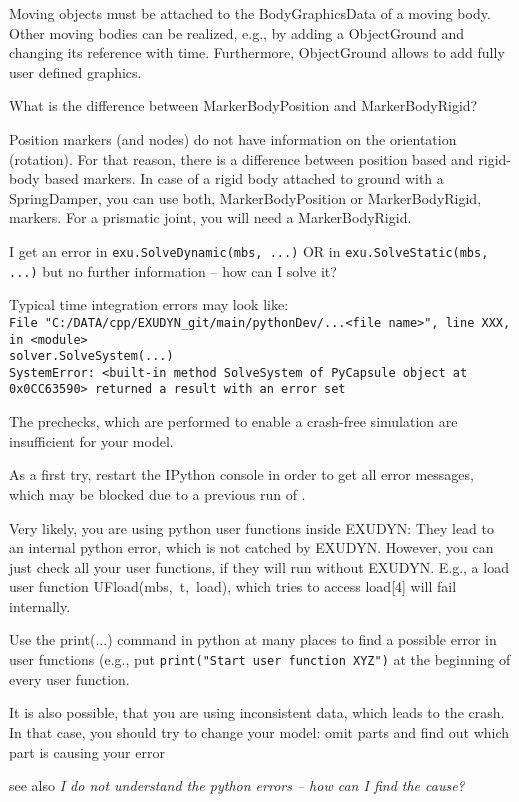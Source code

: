 	Moving objects must be attached to the BodyGraphicsData of a moving body. Other moving bodies can be realized, e.g., by adding a ObjectGround and changing its reference with time. Furthermore, ObjectGround allows to add fully user defined graphics.
	\ei
  \item What is the difference between MarkerBodyPosition and MarkerBodyRigid?
	\bi
	\item[$\ra$] Position markers (and nodes) do not have information on the orientation (rotation). For that reason, there is a difference between position based and rigid-body based markers. In case of a rigid body attached to ground with a SpringDamper, you can use both, MarkerBodyPosition or MarkerBodyRigid, markers. For a prismatic joint, you will need a MarkerBodyRigid.
	\ei
  \item I get an error in \texttt{exu.SolveDynamic(mbs, ...)} OR in \texttt{exu.SolveStatic(mbs, ...)}
	but no further information -- how can I solve it?
	\bi
	\item[$\ra$] Typical time integration errors may look like:\\
	{\footnotesize
  \texttt{File "C:/DATA/cpp/EXUDYN\_git/main/pythonDev/...<file name>", line XXX, in <module>}\\  
	\texttt{solver.SolveSystem(...)}\\
  \texttt{SystemError: <built-in method SolveSystem of PyCapsule object at 0x0CC63590> returned a result with an error set}}
	\item[$\ra$] The prechecks, which are performed to enable a crash-free simulation are insufficient for your model.
	\item[$\ra$] As a first try, restart the IPython console in order to get all error messages, which may be blocked due to a previous run of \codeName.
	\item[$\ra$] Very likely, you are using python user functions inside EXUDYN: They lead to an internal python error, which is not catched by EXUDYN. However, you can just check all your user functions, if they will run without EXUDYN. E.g., a load user function UFload(mbs,~t,~load), which tries to access load[4] will fail internally.
	\item[$\ra$] Use the print(...) command in python at many places to find a possible error in user functions (e.g., put \texttt{print("Start user function XYZ")} at the beginning of every user function.
	\item[$\ra$] It is also possible, that you are using inconsistent data, which leads to the crash. In that case, you should try to change your model: omit parts and find out which part is causing your error
	\item[$\ra$] see also {\it I do not understand the python errors -- how can I find the cause?}
 	\ei


